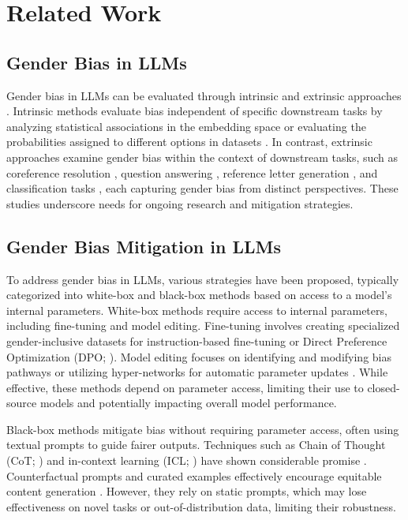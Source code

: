 \section{Related Work}
\subsection{Gender Bias in LLMs}
Gender bias in LLMs can be evaluated through intrinsic and extrinsic approaches \cite{li2023survey, zayed2024fairness}. Intrinsic methods evaluate bias independent of specific downstream tasks by analyzing statistical associations in the embedding space \cite{kurita2019measuring, may2019measuring} or evaluating the probabilities assigned to different options in datasets \cite{nangia2020crows, nadeem2020stereoset}.
In contrast, extrinsic approaches examine gender bias within the context of downstream tasks, such as coreference resolution \cite{levy2021collecting, kotek2023gender}, question answering \cite{feng2023pretraining}, reference letter generation \cite{wan2023kelly}, and classification tasks \cite{de2019bias}, each capturing gender bias from distinct perspectives. These studies underscore needs for ongoing research and mitigation strategies.
\vspace{-0.5em}

\subsection{Gender Bias Mitigation in LLMs}
To address gender bias in LLMs, various strategies have been proposed, typically categorized into white-box and black-box methods based on access to a model's internal parameters.
White-box methods require access to internal parameters, including fine-tuning and model editing. Fine-tuning involves creating specialized gender-inclusive datasets \cite{bartl2024showgirls, dong2024disclosure} for instruction-based fine-tuning \cite{raza2024mbias, thakur2023language} or Direct Preference Optimization (DPO; \citealp{zhang2024genderalign, allam2024biasdpo}). Model editing focuses on identifying and modifying bias pathways \cite{cai2024locating} or utilizing hyper-networks for automatic parameter updates \cite{anonymous2024Editbias}. While effective, these methods depend on parameter access, limiting their use to closed-source models and potentially impacting overall model performance.

Black-box methods mitigate bias without requiring parameter access, often using textual prompts to guide fairer outputs. Techniques such as Chain of Thought (CoT; \citealp{wei2022chain}) and in-context learning (ICL; \citealp{brown2020language}) have shown considerable promise \cite{sant2024power, ganguli2023capacity}. Counterfactual prompts and curated examples effectively encourage equitable content generation \cite{si2022prompting, dwivedi2023breaking, oba2024contextual}. However, they rely on static prompts, which may lose effectiveness on novel tasks or out-of-distribution data, limiting their robustness.
\vspace{-0.5em}

